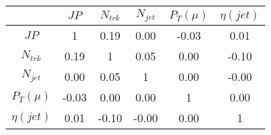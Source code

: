 \begin{tabular}{|c|c|c|c|c|c|} 
\hline
 & $JP$ & $N_{trk}$ & $N_{jet}$ & $P_{T} (\mu)$ & $\eta (jet)$ \\ \hline
$JP$ & 1 & 0.19 & 0.00 & -0.03 & 0.01 \\
$N_{trk}$ & 0.19 & 1 & 0.05 & 0.00 & -0.10 \\
$N_{jet}$ & 0.00 & 0.05 & 1 & 0.00 & -0.00 \\
$P_{T} (\mu)$ & -0.03 & 0.00 & 0.00 & 1 & 0.00 \\
$\eta (jet)$ & 0.01 & -0.10 & -0.00 & 0.00 & 1 \\
\hline 
\end{tabular} 


